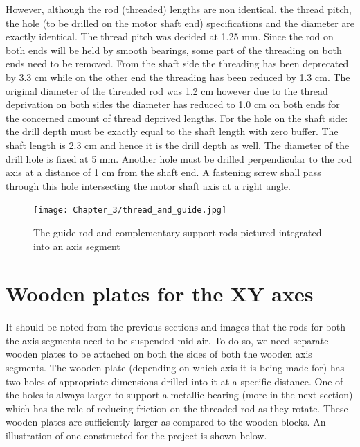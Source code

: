 However, although the rod (threaded) lengths are non identical, the thread pitch, the hole (to be drilled on the motor shaft end) specifications and the diameter are exactly identical. The thread pitch was decided at 1.25 mm. Since the rod on both ends will be held by smooth bearings, some part of the threading on both ends need to be removed. From the shaft side the threading has been deprecated by 3.3 cm while on the other end the threading has been reduced by 1.3 cm. The original diameter of the threaded rod was 1.2 cm however due to the thread deprivation on both sides the diameter has reduced to 1.0 cm on both ends for the concerned amount of thread deprived lengths. For the hole on the shaft side: the drill depth must be exactly equal to the shaft length with zero buffer. The shaft length is 2.3 cm and hence it is the drill depth as well. The diameter of the drill hole is fixed at 5 mm. Another hole must be drilled perpendicular to the rod axis at a distance of 1 cm from the shaft end. A fastening screw shall pass through this hole intersecting the motor shaft axis at a right angle.

\begin{figure}[h]
 \centering
 \texttt{[image: Chapter\_3/thread\_and\_guide.jpg]}
 \caption{The guide rod and complementary support rods pictured integrated into an axis segment }
 \label{fig:xy_rods}
\end{figure}


\section{Wooden plates for the XY axes}

It should be noted from the previous sections and images that the rods for both the axis segments need to be suspended mid air. To do so, we need separate wooden plates to be attached on both the sides of both the wooden axis segments. The wooden plate (depending on which axis it is being made for) has two holes of appropriate dimensions drilled into it at a specific distance. One of the holes is always larger to support a metallic bearing (more in the next section) which has the role of reducing friction on the threaded rod as they rotate. These wooden plates are sufficiently larger as compared to the wooden blocks. An illustration of one constructed for the project is shown below.

